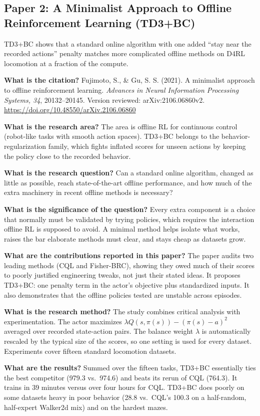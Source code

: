 \documentclass[11pt]{article}
\newcommand{\paper}[1]{\subsection*{#1}}
\newcommand{\q}[2]{\item \textbf{#1} #2}
\begin{document}
\paper{Paper 2: A Minimalist Approach to Offline Reinforcement Learning (TD3+BC)}
TD3+BC shows that a standard online algorithm with one added ``stay near the recorded actions'' penalty matches more complicated offline methods on D4RL locomotion at a fraction of the compute.
\begin{qna}

\q{What is the citation?}
Fujimoto, S., \& Gu, S. S. (2021). A minimalist approach to offline reinforcement learning. \emph{Advances in Neural Information Processing Systems, 34}, 20132--20145. Version reviewed: arXiv:2106.06860v2. \url{https://doi.org/10.48550/arXiv.2106.06860}

\q{What is the research area?}
The area is offline RL for continuous control (robot-like tasks with smooth action spaces). TD3+BC belongs to the behavior-regularization family, which fights inflated scores for unseen actions by keeping the policy close to the recorded behavior.

\q{What is the research question?}
Can a standard online algorithm, changed as little as possible, reach state-of-the-art offline performance, and how much of the extra machinery in recent offline methods is necessary?

\q{What is the significance of the question?}
Every extra component is a choice that normally must be validated by trying policies, which requires the interaction offline RL is supposed to avoid. A minimal method helps isolate what works, raises the bar elaborate methods must clear, and stays cheap as datasets grow.

\q{What are the contributions reported in this paper?}
The paper audits two leading methods (CQL and Fisher-BRC), showing they owed much of their scores to poorly justified engineering tweaks, not just their stated ideas. It proposes TD3+BC: one penalty term in the actor's objective plus standardized inputs. It also demonstrates that the offline policies tested are unstable across episodes.

\q{What is the research method?}
The study combines critical analysis with experimentation. The actor maximizes $\lambda Q(s,\pi(s)) - (\pi(s)-a)^2$ averaged over recorded state-action pairs. The balance weight $\lambda$ is automatically rescaled by the typical size of the scores, so one setting is used for every dataset. Experiments cover fifteen standard locomotion datasets.

\q{What are the results?}
Summed over the fifteen tasks, TD3+BC essentially ties the best competitor (979.3 vs.\ 974.6) and beats its rerun of CQL (764.3). It trains in 39 minutes versus over four hours for CQL. TD3+BC does poorly on some datasets heavy in poor behavior (28.8 vs.\ CQL's 100.3 on a half-random, half-expert Walker2d mix) and on the hardest mazes.


\end{qna}
\end{document}
